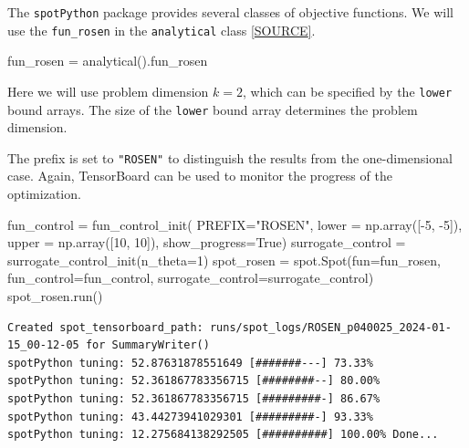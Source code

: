 \documentclass[
  letterpaper,
  DIV=11,
  numbers=noendperiod]{scrreprt}
\newenvironment{Shaded}{\begin{snugshade}}{\end{snugshade}}
\newcommand{\DecValTok}[1]{\textcolor[rgb]{0.68,0.00,0.00}{#1}}
\newcommand{\NormalTok}[1]{\textcolor[rgb]{0.00,0.23,0.31}{#1}}
\newcommand{\OperatorTok}[1]{\textcolor[rgb]{0.37,0.37,0.37}{#1}}
\newcommand{\StringTok}[1]{\textcolor[rgb]{0.13,0.47,0.30}{#1}}
\newcommand{\VariableTok}[1]{\textcolor[rgb]{0.07,0.07,0.07}{#1}}
\begin{document}
The \texttt{spotPython} package provides several classes of objective
functions. We will use the \texttt{fun\_rosen} in the
\texttt{analytical} class
\href{https://github.com/sequential-parameter-optimization/spotPython/blob/main/src/spotPython/fun/objectivefunctions.py}{{[}SOURCE{]}}.

\begin{Shaded}
\begin{Highlighting}[]
\NormalTok{fun\_rosen }\OperatorTok{=}\NormalTok{ analytical().fun\_rosen}
\end{Highlighting}
\end{Shaded}

Here we will use problem dimension \(k=2\), which can be specified by
the \texttt{lower} bound arrays. The size of the \texttt{lower} bound
array determines the problem dimension.

The prefix is set to \texttt{"ROSEN"} to distinguish the results from
the one-dimensional case. Again, TensorBoard can be used to monitor the
progress of the optimization.

\begin{Shaded}
\begin{Highlighting}[]
\NormalTok{fun\_control }\OperatorTok{=}\NormalTok{ fun\_control\_init(}
\NormalTok{              PREFIX}\OperatorTok{=}\StringTok{"ROSEN"}\NormalTok{,}
\NormalTok{              lower }\OperatorTok{=}\NormalTok{ np.array([}\OperatorTok{{-}}\DecValTok{5}\NormalTok{, }\OperatorTok{{-}}\DecValTok{5}\NormalTok{]),}
\NormalTok{              upper }\OperatorTok{=}\NormalTok{ np.array([}\DecValTok{10}\NormalTok{, }\DecValTok{10}\NormalTok{]),}
\NormalTok{              show\_progress}\OperatorTok{=}\VariableTok{True}\NormalTok{)}
\NormalTok{surrogate\_control }\OperatorTok{=}\NormalTok{ surrogate\_control\_init(n\_theta}\OperatorTok{=}\DecValTok{1}\NormalTok{)}
\NormalTok{spot\_rosen }\OperatorTok{=}\NormalTok{ spot.Spot(fun}\OperatorTok{=}\NormalTok{fun\_rosen,}
\NormalTok{                  fun\_control}\OperatorTok{=}\NormalTok{fun\_control,}
\NormalTok{                  surrogate\_control}\OperatorTok{=}\NormalTok{surrogate\_control)}
\NormalTok{spot\_rosen.run()}
\end{Highlighting}
\end{Shaded}

\begin{verbatim}
Created spot_tensorboard_path: runs/spot_logs/ROSEN_p040025_2024-01-15_00-12-05 for SummaryWriter()
spotPython tuning: 52.87631878551649 [#######---] 73.33% 
spotPython tuning: 52.361867783356715 [########--] 80.00% 
spotPython tuning: 52.361867783356715 [#########-] 86.67% 
spotPython tuning: 43.44273941029301 [#########-] 93.33% 
spotPython tuning: 12.275684138292505 [##########] 100.00% Done...
\end{verbatim}
\end{document}
